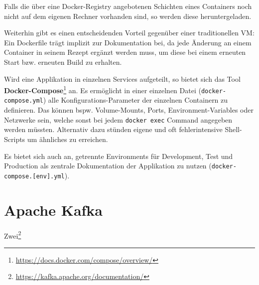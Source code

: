 Falls die über eine Docker-Registry angebotenen Schichten eines Containers noch nicht auf dem eigenen Rechner vorhanden sind, so werden diese heruntergeladen.
\par
Weiterhin gibt es einen entscheidenden Vorteil gegenüber einer traditionellen \ac{VM}: Ein Dockerfile trägt implizit zur Dokumentation bei, da jede Änderung an einem Container in seinem Rezept ergänzt werden muss, um diese bei einem erneuten Start \ac{bzw.} erneuten Build zu erhalten.
\par
Wird eine Applikation in einzelnen Services aufgeteilt, so bietet sich das Tool \textbf{Docker-Compose}\footnote{\url{https://docs.docker.com/compose/overview/}} an.
Es ermöglicht in einer einzelnen Datei (\texttt{docker-\break compose.yml}) alle Konfigurations-Parameter der einzelnen Containern zu definieren.
Das können \ac{bspw.} Volume-Mounts, Ports, Environment-Variables oder Netzwerke sein, welche sonst bei jedem \texttt{docker exec} Command angegeben werden müssten.
Alternativ dazu stünden eigene und oft fehlerintensive Shell-Scripts um ähnliches zu erreichen. 
\par
Es bietet sich auch an, getrennte Environments für Development, Test und Production als zentrale Dokumentation der Applikation zu nutzen (\texttt{docker-\break compose.[env].yml}).

\section{Apache Kafka}
Zwei\footnote{\url{https://kafka.apache.org/documentation/}}
\par
\blindtext
\par
\blindtext

